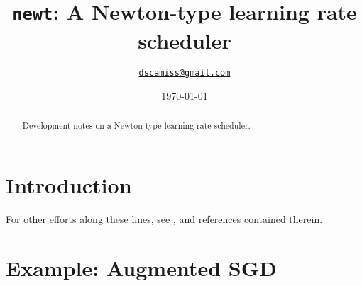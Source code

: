 \documentclass{article}
\title{\texttt{newt}: A Newton-type learning rate scheduler}
\date{\today}
\author{\href{mailto:dscamiss@gmail.com}{\texttt{dscamiss@gmail.com}}}
\begin{document}
\maketitle
\begin{abstract}
    Development notes on a Newton-type learning rate scheduler.
\end{abstract}


\section{Introduction}

For other efforts along these lines, see
\citep{retsinas2022trainable}, \citep{retstinas2023trainable}
and references contained therein.

\section{Example: Augmented SGD}
\end{document}
